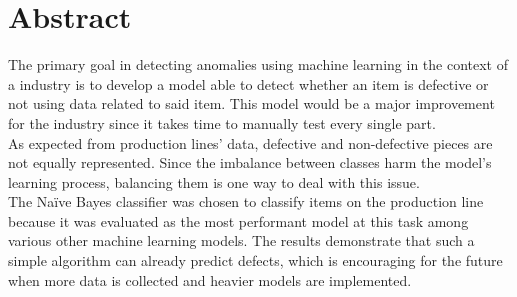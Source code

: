 \section*{Abstract}
The primary goal in detecting anomalies using machine learning in the context of a industry is to develop a model able to detect whether an item is defective or not using data related to said item. This model would be a major improvement for the industry since it takes time to manually test every single part.\\
As expected from production lines' data, defective and non-defective pieces are not equally represented. Since the imbalance between classes harm the model's learning process, balancing them is one way to deal with this issue.\\
The Naïve Bayes classifier was chosen to classify items on the production line because it was evaluated as the most performant model at this task among various other machine learning models. The results demonstrate that such a simple algorithm can already predict defects, which is encouraging for the future when more data is collected and heavier models are implemented.